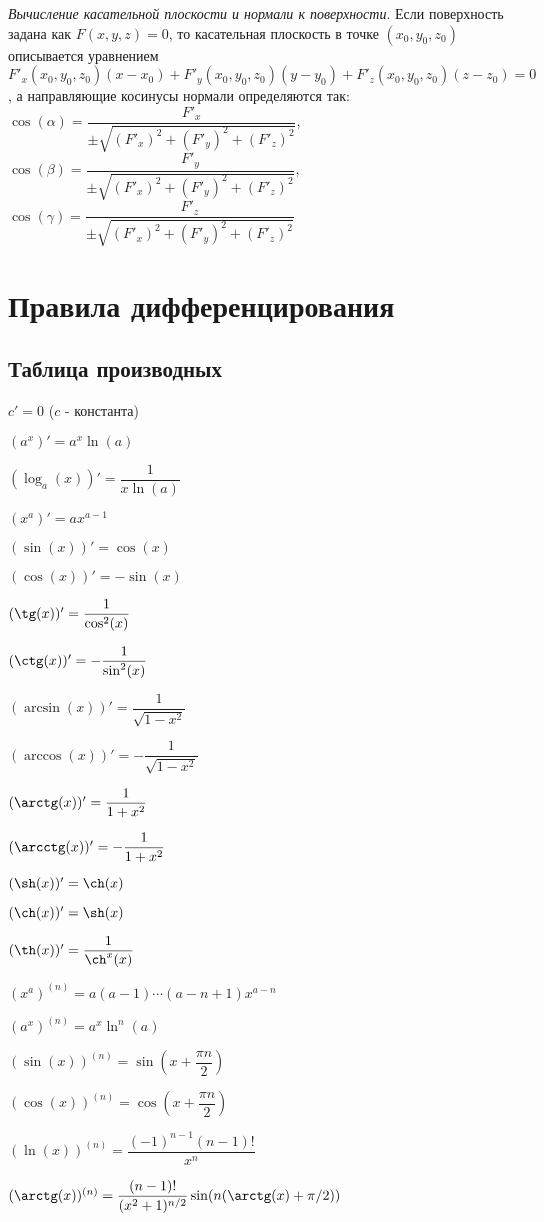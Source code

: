 \documentclass[a4paper,12pt]{scrartcl}
\begin{document}
{\emph{Вычисление касательной плоскости и нормали к поверхности}}. Если поверхность задана как $F(x,y,z) = 0$, то касательная плоскость в точке $(x_0,y_0,z_0)$ описывается уравнением $F'_x(x_0,y_0,z_0)(x-x_0) + F'_y(x_0,y_0,z_0)(y-y_0) + F'_z(x_0,y_0,z_0)(z-z_0) = 0$, а направляющие косинусы нормали определяются так: $\cos(\alpha) = \dfrac{F'_x}{\pm \sqrt{(F'_x) ^2 +(F'_y)^2+ (F'_z)^2}}$, $\cos(\beta) = \dfrac{F'_y}{\pm \sqrt{(F'_x) ^2 +(F'_y)^2+ (F'_z)^2}}$, $\cos(\gamma) = \dfrac{F'_z}{\pm \sqrt{(F'_x) ^2 +(F'_y)^2+ (F'_z)^2}}$

\section{Правила дифференцирования}
\subsection{Таблица производных}
\begin{enumerate}
\begin{multicols}{2}
\item $c' = 0$ ($c$ - константа)
\item $(a^x)' = a^x\ln(a)$
\item $(\log_a(x))' = \dfrac{1}{x\ln(a)}$
\item $(x^a)' = ax^{a-1}$
\item $(\sin(x))' = \cos(x)$
\item $(\cos(x))' = -\sin(x)$
\item $(\tg(x))' = \dfrac{1}{\cos^2(x)}$
\item $(\ctg(x))' = -\dfrac{1}{\sin^2(x)}$
\item $(\arcsin(x))'= \dfrac{1}{\sqrt{1 - x^2}}$
\item $(\arccos(x))'= -\dfrac{1}{\sqrt{1-x^2}}$
\item $(\arctg(x))' = \dfrac{1}{1+x^2} $
\item $(\arcctg(x))' = -\dfrac{1}{1+x^2}$
\item $(\sh(x))' = \ch(x)$
\item $(\ch(x))' = \sh(x)$
\item $(\th(x))' = \dfrac{1}{\ch^x(x)}$


\item $(x^a)^{(n)} = a(a-1)\cdots(a-n+1)x^{a-n}$
\item $(a^x)^{(n)} = a^x\ln^n(a)$
\item $(\sin(x))^{(n)} = \sin\left(x + \dfrac{\pi n}{2}\right)$
\item $(\cos(x))^{(n)} = \cos\left(x + \dfrac{\pi n}{2}\right)$
\item $(\ln(x))^{(n)} = \dfrac{(-1)^{n-1}(n-1)!}{x^n}$
\item $(\arctg(x))^{(n)} = \dfrac{(n-1)!}{(x^2 +1)^{n/2}}\sin(n(\arctg(x) + \pi/2))$
\end{multicols}
\end{enumerate}
\end{document}

